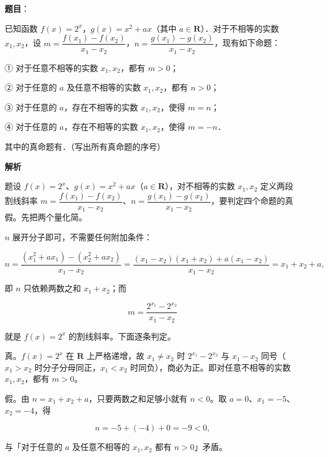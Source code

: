 \begin{answer}

\textbf{题目}：

已知函数 \(f(x)=2^x\)，\(g(x)=x^2+ax\)（其中 \(a\in\mathbf{R}\)）．对于不相等的实数 \(x_1,x_2\)，设 \(m=\dfrac{f(x_1)-f(x_2)}{x_1-x_2}\)，\(n=\dfrac{g(x_1)-g(x_2)}{x_1-x_2}\)，现有如下命题：

① 对于任意不相等的实数 \(x_1,x_2\)，都有 \(m>0\)；

② 对于任意的 \(a\) 及任意不相等的实数 \(x_1,x_2\)，都有 \(n>0\)；

③ 对于任意的 \(a\)，存在不相等的实数 \(x_1,x_2\)，使得 \(m=n\)；

④ 对于任意的 \(a\)，存在不相等的实数 \(x_1,x_2\)，使得 \(m=-n\)．

其中的真命题有\gkblank{}．（写出所有真命题的序号）

\textbf{解析}

题设 \(f(x)=2^{x}\)、\(g(x)=x^{2}+ax\)（\(a\in\mathbf{R}\)），对不相等的实数 \(x_1,x_2\) 定义两段割线斜率 \(m=\dfrac{f(x_1)-f(x_2)}{x_1-x_2}\)、\(n=\dfrac{g(x_1)-g(x_2)}{x_1-x_2}\)，要判定四个命题的真假。先把两个量化简。

\(n\) 展开分子即可，不需要任何附加条件：

\nopagebreak[4]
\[
n=\frac{\left(x_1^{2}+ax_1\right)-\left(x_2^{2}+ax_2\right)}{x_1-x_2}
=\frac{(x_1-x_2)(x_1+x_2)+a(x_1-x_2)}{x_1-x_2}
=x_1+x_2+a,
\]

即 \(n\) 只依赖两数之和 \(x_1+x_2\)；而

\nopagebreak[4]
\[
m=\frac{2^{x_1}-2^{x_2}}{x_1-x_2}
\]

就是 \(f(x)=2^{x}\) 的割线斜率。下面逐条判定。


真。\(f(x)=2^{x}\) 在 \(\mathbf{R}\) 上严格递增，故 \(x_1\neq x_2\) 时 \(2^{x_1}-2^{x_2}\) 与 \(x_1-x_2\) 同号（\(x_1>x_2\) 时分子分母同正，\(x_1<x_2\) 时同负），商必为正。即对任意不相等的实数 \(x_1,x_2\)，都有 \(m>0\)。


假。由 \(n=x_1+x_2+a\)，只要两数之和足够小就有 \(n<0\)。取 \(a=0\)、\(x_1=-5\)、\(x_2=-4\)，得

\nopagebreak[4]
\[
n=-5+(-4)+0=-9<0,
\]

与「对于任意的 \(a\) 及任意不相等的 \(x_1,x_2\) 都有 \(n>0\)」矛盾。



\end{answer}
